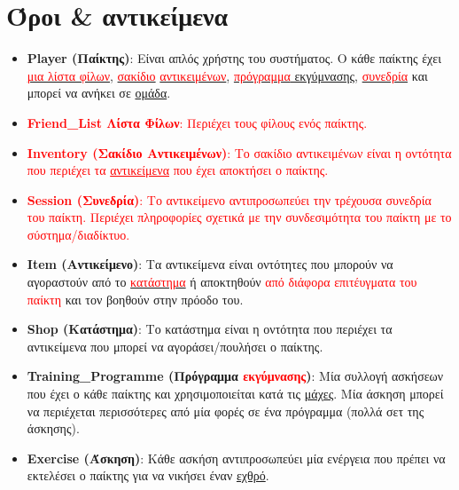 \section{Όροι \& αντικείμενα}

\begin{itemize}
    \item \textbf{Player (Παίκτης)}: Είναι απλός χρήστης του συστήματος. Ο κάθε παίκτης έχει \underline{\textcolor{red}{μια λίστα φίλων}}, \underline{\textcolor{red}{σακίδιο}} \underline{\textcolor{red}{αντικειμένων}}, \underline{\textcolor{red}{πρόγραμμα} εκγύμνασης}, \underline{\textcolor{red}{συνεδρία}} και μπορεί να ανήκει σε \underline{ομάδα}.
    
    \item \textcolor{red}{\textbf{Friend\_List {Λίστα Φίλων}}: Περιέχει τους φίλους ενός παίκτης.}
    
    \item \textcolor{red}{\textbf{Inventory (Σακίδιο Αντικειμένων)}: Το σακίδιο αντικειμένων είναι η οντότητα που περιέχει τα \underline{αντικείμενα} που έχει αποκτήσει ο παίκτης.}
    
    \item \textcolor{red}{\textbf{Session (Συνεδρία)}: Το αντικείμενο αντιπροσωπεύει την τρέχουσα συνεδρία του παίκτη. Περιέχει πληροφορίες σχετικά με την συνδεσιμότητα του παίκτη με το σύστημα/διαδίκτυο.}

    \item \textbf{Item (Αντικείμενο)}: Τα αντικείμενα είναι οντότητες που μπορούν να αγοραστούν από το \underline{\textcolor{red}{κατάστημα}} ή αποκτηθούν \textcolor{red}{από διάφορα επιτέυγματα του παίκτη} και τον βοηθούν στην πρόοδο του.
    
    \item \textbf{Shop (Κατάστημα)}: Το κατάστημα είναι η οντότητα που περιέχει τα αντικείμενα που μπορεί να αγοράσει/πουλήσει ο παίκτης.
    
    \item \textbf{Training\_Programme (Πρόγραμμα \textcolor{red}{εκγύμνασης})}: Μία συλλογή ασκήσεων που έχει ο κάθε παίκτης και χρησιμοποιείται κατά τις \underline{μάχες}. Μία άσκηση μπορεί να περιέχεται περισσότερες από μία φορές σε ένα πρόγραμμα (πολλά σετ της άσκησης).
    
    \item \textbf{Exercise (Άσκηση)}: Κάθε ασκήση αντιπροσωπεύει μία ενέργεια που πρέπει να εκτελέσει ο παίκτης για να νικήσει έναν \underline{εχθρό}.
    

\end{itemize}
